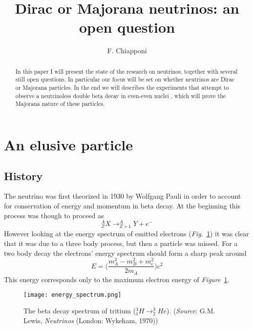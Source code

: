 \documentclass{subnucbo}
\begin{document}
\title{Dirac or Majorana neutrinos: an open question}

\author{F. Chiapponi} 



\maketitle

\begin{abstract}
In this paper I will present the state of the research on neutrinos, together with several still open questions. In particular our focus will be set on whether neutrinos are Dirac or Majorana particles. In the end we will describes the experiments that attempt to observe a neutrinoless double beta decay in even-even nuclei%
, which will prove the Majorana nature of these particles.
\end{abstract}

\section{An elusive particle}
\subsection{History}
The neutrino was first theorized in 1930 by Wolfgang Pauli in order to account for conservation of energy and momentum in beta decay.
At the beginning this process was though to proceed as
\[
^A_Z X\rightarrow ^A_{Z+1}Y+e^-
\]
However looking at the energy spectrum of emitted electrons (\emph{Fig.}~\ref{fig:betaD}) it was clear that it was due to a three body process, but then a particle was missed. For a two body decay the electrons' energy spectrum should form a sharp peak around 
\begin{equation}
E=\biggl(\frac{m^2_A-m^2_B+m^2_e}{2m_A}\biggr)c^2
\label{eq:Emax}
\end{equation}
This energy corresponds only to the maximum electron energy of \emph{Figure}~\ref{fig:betaD}.

\begin{figure}[h]
\centering
\texttt{[image: energy\_spectrum.png]}
\caption{The beta decay spectrum of tritium ($^3_1H\rightarrow ^3_2He$). (\emph{Source}: G.M. Lewis, \emph{Neutrinos} (London: Wykeham, 1970))}
\label{fig:betaD}
\end{figure}
\end{document}
